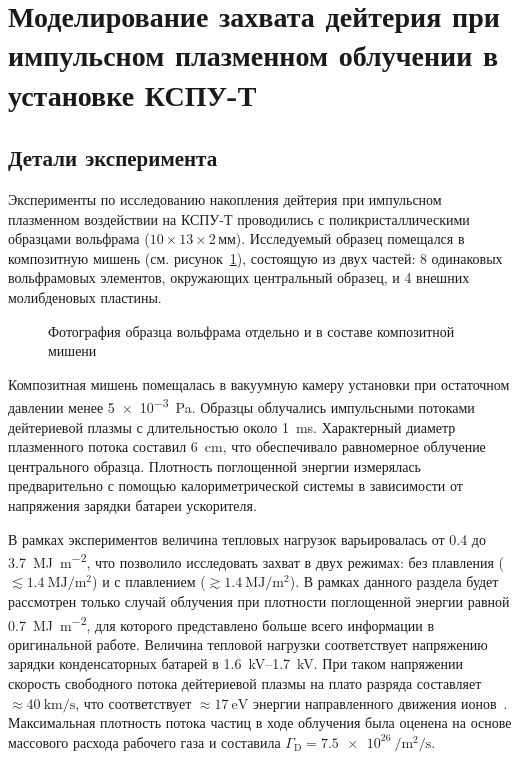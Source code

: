 \section{Моделирование захвата дейтерия при импульсном плазменном облучении в установке КСПУ-Т}\label{sec:ch3/sec1}
\subsection{Детали эксперимента}\label{sec:ch3/sec1/subsec1}
Эксперименты по исследованию накопления дейтерия при импульсном плазменном воздействии на КСПУ-Т проводились с поликристаллическими образцами вольфрама ($10\times13\times2$\,мм). Исследуемый образец помещался в композитную мишень (см. рисунок~\cref{fig:ch3/QSPA_target}), состоящую из двух частей: 8 одинаковых вольфрамовых элементов, окружающих центральный образец, и 4 внешних молибденовых пластины.
\begin{figure}[ht]
	\caption{Фотография образца вольфрама отдельно и в составе композитной мишени~\cite{Poskakalov2020}}\label{fig:ch3/QSPA_target}
\end{figure}
Композитная мишень помещалась в вакуумную камеру установки при остаточном давлении менее \SI{5e-3}{\pascal}. Образцы облучались импульсными потоками дейтериевой плазмы с длительностью около \SI{1}{\milli\second}. Характерный диаметр плазменного потока составил \SI{6}{\centi\meter}, что обеспечивало равномерное облучение центрального образца. Плотность поглощенной энергии измерялась предварительно с помощью калориметрической системы в зависимости от напряжения зарядки батареи ускорителя. 

В рамках экспериментов величина тепловых нагрузок варьировалась от \num{0.4} до \SI{3.7}{\mega\joule\per\meter\squared}, что позволило исследовать захват в двух режимах: без плавления (\( \lesssim \SI{1.4}{\mega\joule\per\meter\squared} \)) и с плавлением (\( \gtrsim \SI{1.4}{\mega\joule\per\meter\squared} \)). В рамках данного раздела будет рассмотрен только случай облучения при плотности поглощенной энергии равной \SI{0.7}{\mega\joule\per\meter\squared}, для которого представлено больше всего информации в оригинальной работе. Величина тепловой нагрузки соответствует напряжению зарядки конденсаторных батарей в \SIrange{1.6}{1.7}{\kilo\volt}. При таком напряжении скорость свободного потока дейтериевой плазмы на плато разряда составляет \(\approx \SI{40}{\kilo\meter\per\second} \), что соответствует \(\approx \SI{17}{\electronvolt} \) энергии направленного движения ионов~\cite{Yaroshevskaya2024}. Максимальная плотность потока частиц в ходе облучения была оценена на основе массового расхода рабочего газа и составила \( \Gamma_\mathrm{D}=\SI{7.5e26}{\per\meter\squared\per\second} \).

